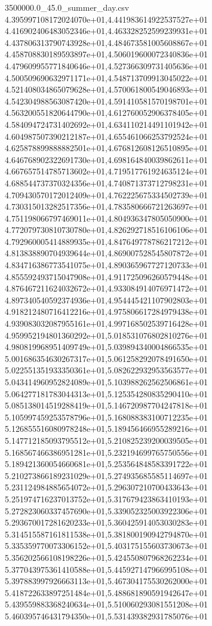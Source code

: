 \begin{filecontents*}{3500000.0_45.0_summer_day.csv}
4.395997108172024070e+01,4.441983614922537527e+01
4.416902406483052346e+01,4.463328252599239931e+01
4.437806313790743928e+01,4.484673581005608867e+01
4.458708830189593897e+01,4.506019600072340836e+01
4.479609955771840646e+01,4.527366309731405636e+01
4.500509690632971171e+01,4.548713709913045022e+01
4.521408034865079628e+01,4.570061800549046893e+01
4.542304988563087420e+01,4.591410581570198701e+01
4.563200551820644790e+01,4.612760052906378405e+01
4.584094724731402692e+01,4.634110214491101942e+01
4.604987507390212187e+01,4.655461066253792524e+01
4.625878899888882501e+01,4.676812608126510895e+01
4.646768902322691730e+01,4.698164840039862611e+01
4.667657514785713602e+01,4.719517761924635124e+01
4.688544737370324356e+01,4.740871373712798231e+01
4.709430570172012409e+01,4.762225675334502739e+01
4.730315013282517356e+01,4.783580666721263697e+01
4.751198066797469011e+01,4.804936347805050900e+01
4.772079730810730780e+01,4.826292718516106106e+01
4.792960005414889935e+01,4.847649778786217212e+01
4.813838890704939644e+01,4.869007528545807872e+01
4.834716386773541075e+01,4.890365967727120733e+01
4.855592493715047908e+01,4.911725096260579448e+01
4.876467211624032672e+01,4.933084914076971472e+01
4.897340540592374936e+01,4.954445421107902803e+01
4.918212480716412216e+01,4.975806617284979438e+01
4.939083032087955161e+01,4.997168502539716428e+01
4.959952194801360292e+01,5.018531076802810276e+01
4.980819968951409749e+01,5.039894340004866535e+01
5.001686354630267317e+01,5.061258292078491650e+01
5.022551351933350361e+01,5.082622932953563577e+01
5.043414960952824089e+01,5.103988262562506861e+01
5.064277181783044313e+01,5.125354280835290410e+01
5.085138014519288419e+01,5.146720987704247818e+01
5.105997459253578796e+01,5.168088383100712235e+01
5.126855516080978248e+01,5.189456466955289216e+01
5.147712185093795512e+01,5.210825239200039505e+01
5.168567466386951281e+01,5.232194699765750556e+01
5.189421360054660681e+01,5.253564848583391722e+01
5.210273866189231029e+01,5.274935685585114697e+01
5.231124984885654072e+01,5.296307210700433643e+01
5.251974716237013752e+01,5.317679423863410193e+01
5.272823060337457690e+01,5.339052325003922306e+01
5.293670017281620233e+01,5.360425914053030283e+01
5.314515587161811538e+01,5.381800190942794870e+01
5.335359770073306152e+01,5.403175155603730673e+01
5.356202566108198226e+01,5.424550807968262234e+01
5.377043975361410588e+01,5.445927147966995108e+01
5.397883997926663113e+01,5.467304175530262000e+01
5.418722633897251484e+01,5.488681890591942647e+01
5.439559883368240634e+01,5.510060293081551208e+01
5.460395746431794350e+01,5.531439382931785076e+01

\end{filecontents*}

